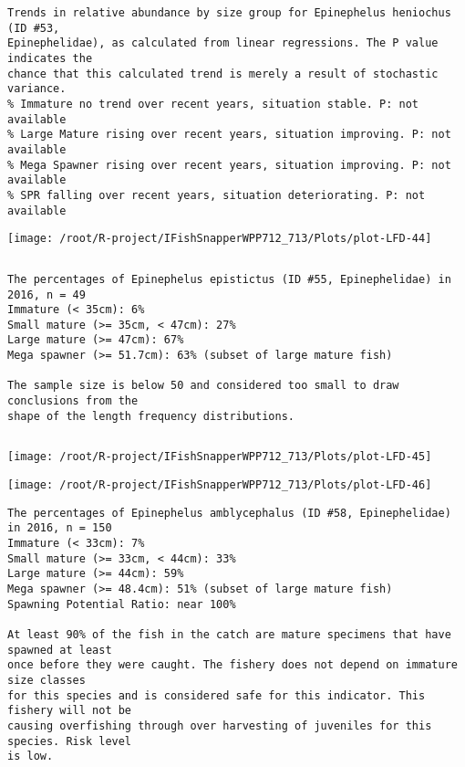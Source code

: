 \documentclass{report}\usepackage[]{graphicx}\usepackage[]{color}
\makeatletter
\def\maxwidth{ %
  \ifdim\Gin@nat@width>\linewidth
    \linewidth
  \else
    \Gin@nat@width
  \fi
}
\newenvironment{kframe}{%
 \def\at@end@of@kframe{}%
 \ifinner\ifhmode%
  \def\at@end@of@kframe{\end{minipage}}%
  \begin{minipage}{\columnwidth}%
 \fi\fi%
 \def\FrameCommand##1{\hskip\@totalleftmargin \hskip-\fboxsep
 \colorbox{shadecolor}{##1}\hskip-\fboxsep
     \hskip-\linewidth \hskip-\@totalleftmargin \hskip\columnwidth}%
 \MakeFramed {\advance\hsize-\width
   \@totalleftmargin\z@ \linewidth\hsize
   \@setminipage}}%
 {\par\unskip\endMakeFramed%
 \at@end@of@kframe}
\newenvironment{knitrout}{}{} %
\makeatother
\begin{document}
\begin{knitrout}
\begin{kframe}
\begin{verbatim}
Trends in relative abundance by size group for Epinephelus heniochus (ID #53,
Epinephelidae), as calculated from linear regressions. The P value indicates the
chance that this calculated trend is merely a result of stochastic variance.
% Immature no trend over recent years, situation stable. P: not available
% Large Mature rising over recent years, situation improving. P: not available
% Mega Spawner rising over recent years, situation improving. P: not available
% SPR falling over recent years, situation deteriorating. P: not available
\end{verbatim}
\end{kframe}
\texttt{[image: /root/R-project/IFishSnapperWPP712\_713/Plots/plot-LFD-44]} 
\begin{kframe}\begin{verbatim}
\end{verbatim}
\end{kframe}
\clearpage
\newpage
\begin{kframe}\begin{verbatim}
The percentages of Epinephelus epistictus (ID #55, Epinephelidae) in 2016, n = 49
Immature (< 35cm): 6%
Small mature (>= 35cm, < 47cm): 27%
Large mature (>= 47cm): 67%
Mega spawner (>= 51.7cm): 63% (subset of large mature fish)
 
The sample size is below 50 and considered too small to draw conclusions from the
shape of the length frequency distributions.
\end{verbatim}
\end{kframe}
\newpage
\begin{kframe}\begin{verbatim}
\end{verbatim}
\end{kframe}
\texttt{[image: /root/R-project/IFishSnapperWPP712\_713/Plots/plot-LFD-45]} 

\texttt{[image: /root/R-project/IFishSnapperWPP712\_713/Plots/plot-LFD-46]} 
\begin{kframe}\begin{verbatim}
The percentages of Epinephelus amblycephalus (ID #58, Epinephelidae) in 2016, n = 150
Immature (< 33cm): 7%
Small mature (>= 33cm, < 44cm): 33%
Large mature (>= 44cm): 59%
Mega spawner (>= 48.4cm): 51% (subset of large mature fish)
Spawning Potential Ratio: near 100%
 
At least 90% of the fish in the catch are mature specimens that have spawned at least
once before they were caught. The fishery does not depend on immature size classes
for this species and is considered safe for this indicator. This fishery will not be
causing overfishing through over harvesting of juveniles for this species. Risk level
is low.


\end{verbatim}
\end{kframe}
\end{knitrout}
\end{document}
